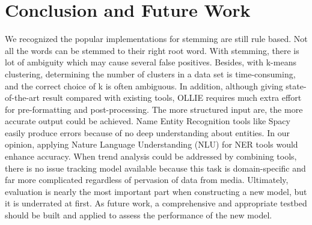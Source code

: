 \section{Conclusion and Future Work} 
We recognized the popular implementations for stemming are still rule based. Not all the words can be stemmed to their right root word. With stemming, there is lot of ambiguity which may cause several false positives. Besides, with k-means clustering, determining the number of clusters in a data set is time-consuming, and the correct choice of k is often ambiguous. In addition, although giving state-of-the-art result compared with existing tools, OLLIE requires much extra effort for pre-formatting and post-processing. The more structured input are, the more accurate output could be achieved. Name Entity Recognition tools like Spacy easily produce errors because of no deep understanding about entities. In our opinion, applying Nature Language Understanding (NLU) for NER tools would enhance accuracy. When trend analysis could be addressed by combining tools, there is no issue tracking model available because this task is domain-specific and far more complicated regardless of pervasion of data from media.
Ultimately, evaluation is nearly the most important part when constructing a new model, but it is underrated at first. As future work, a comprehensive and appropriate testbed should be built and applied to assess the performance of the new model.